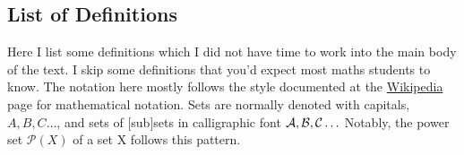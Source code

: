 \clearpage
\noappendicestocpagenum
\begin{appendices}
\section{List of Definitions}
Here I list some definitions which I did not have time to work into the main body of the text. I skip some definitions that you'd expect most maths students to know. The notation here mostly follows the style documented at the \href{https://en.wikipedia.org/wiki/List_of_mathematical_symbols}{Wikipedia} page for mathematical notation. Sets are normally denoted with capitals, $A, B, C\ldots$, and sets of [sub]sets in calligraphic font $\mathcal{A}, \mathcal{B}, \mathcal{C}\ldots$ Notably, the power set $\mathcal{P}(X)$ of a set X follows this pattern.

\end{appendices}